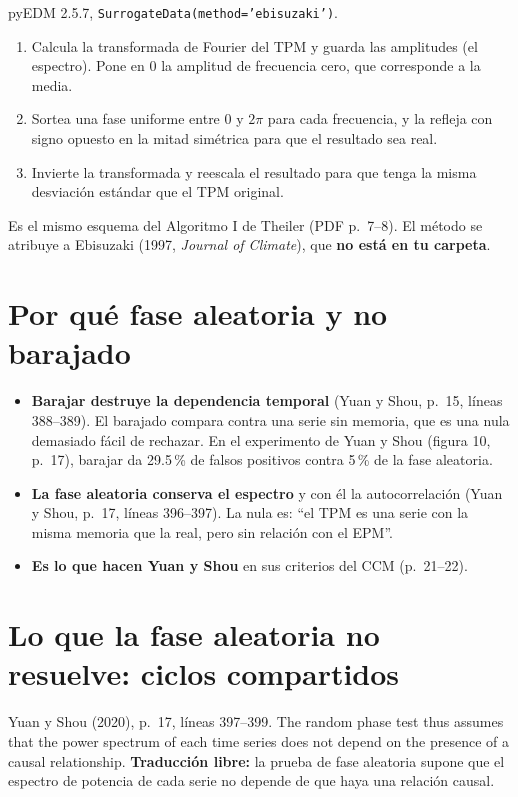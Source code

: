 \documentclass[11pt,openany]{book}
\begin{document}
\begin{codigo}{pyEDM 2.5.7, \texttt{SurrogateData(method='ebisuzaki')}.}
\begin{enumerate}
\item Calcula la transformada de Fourier del TPM y guarda las amplitudes (el espectro). Pone en 0 la amplitud de frecuencia cero, que corresponde a la media.
\item Sortea una fase uniforme entre 0 y $2\pi$ para cada frecuencia, y la refleja con signo opuesto en la mitad simétrica para que el resultado sea real.
\item Invierte la transformada y reescala el resultado para que tenga la misma desviación estándar que el TPM original.
\end{enumerate}
Es el mismo esquema del Algoritmo I de Theiler (PDF p.~7--8). El método se atribuye a Ebisuzaki (1997, \emph{Journal of Climate}), que \textbf{no está en tu carpeta}.
\end{codigo}

\section{Por qué fase aleatoria y no barajado}

\begin{itemize}
\item \textbf{Barajar destruye la dependencia temporal} (Yuan y Shou, p.~15, líneas 388--389). El barajado compara contra una serie sin memoria, que es una nula demasiado fácil de rechazar. En el experimento de Yuan y Shou (figura 10, p.~17), barajar da 29.5\,\% de falsos positivos contra 5\,\% de la fase aleatoria.
\item \textbf{La fase aleatoria conserva el espectro} y con él la autocorrelación (Yuan y Shou, p.~17, líneas 396--397). La nula es: ``el TPM es una serie con la misma memoria que la real, pero sin relación con el EPM''.
\item \textbf{Es lo que hacen Yuan y Shou} en sus criterios del CCM (p.~21--22).
\end{itemize}

\section{Lo que la fase aleatoria no resuelve: ciclos compartidos}

\begin{cita}{Yuan y Shou (2020), p.~17, líneas 397--399.}
The random phase test thus assumes that the power spectrum of each time series does not depend on the presence of a causal relationship.
\tcblower
\textbf{Traducción libre:} la prueba de fase aleatoria supone que el espectro de potencia de cada serie no depende de que haya una relación causal.
\end{cita}
\end{document}
